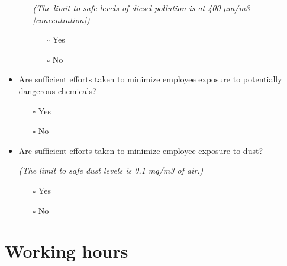 \documentclass[
  12pt,
]{scrbook}
\providecommand{\tightlist}{%
  \setlength{\itemsep}{0pt}\setlength{\parskip}{0pt}}
\begin{document}
\begin{itemize}
\begin{itemize}
    \emph{(The limit to safe levels of diesel pollution is at 400 µm/m3 {[}concentration{]})}

    \begin{itemize}
    \tightlist
    \item[$\square$]
      Yes
    \item[$\square$]
      No
    \end{itemize}
  \end{itemize}
\item
  Are sufficient efforts taken to minimize employee exposure to potentially dangerous chemicals?

  \begin{itemize}
  \tightlist
  \item[$\square$]
    Yes
  \item[$\square$]
    No
  \end{itemize}
\item
  Are sufficient efforts taken to minimize employee exposure to dust?

  \emph{(The limit to safe dust levels is 0,1 mg/m3 of air.)}

  \begin{itemize}
  \tightlist
  \item[$\square$]
    Yes
  \item[$\square$]
    No
  \end{itemize}
\end{itemize}

\hypertarget{working-hours}{%
\section*{Working hours}\label{working-hours}}
\end{document}
